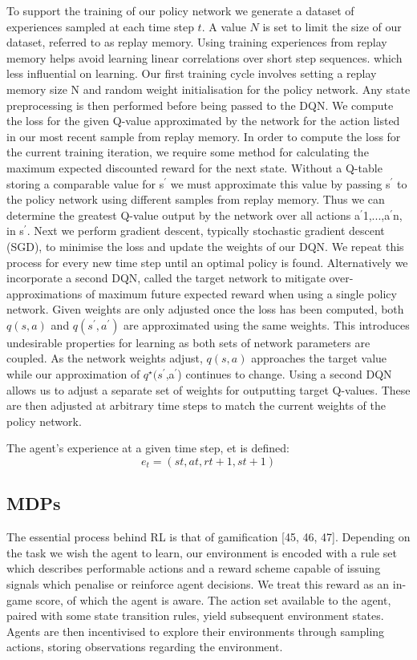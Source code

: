 \documentclass[runningheads]{llncs}
\begin{document}
To support the training of our policy network we generate a dataset of experiences
sampled at each time step $t$. A value $N$ is set to limit the size of our dataset, referred
to as replay memory. Using training experiences from replay memory helps avoid learning linear correlations over short step sequences. which less influential on learning. Our first training cycle involves setting a replay memory size N and random weight initialisation for the policy network. Any state preprocessing is then performed before being passed to the DQN. We compute the loss for the given Q-value approximated by the network for the action listed in our most recent sample from replay memory.
In order to compute the loss for the current training iteration, we require some method for
calculating the maximum expected discounted reward for the next state. Without a Q-table
storing a comparable value for s$^{\prime}$ we must approximate this value by passing s$^{\prime}$ to the policy network using different samples from replay memory. Thus we can determine the
greatest Q-value output by the network over all actions a$^{\prime}$1,...,a$^{\prime}$n, in s$^{\prime}$. Next we perform gradient descent, typically stochastic gradient descent (SGD), to minimise the loss and
update the weights of our DQN. We repeat this process for every new time step until an
optimal policy is found. Alternatively we incorporate a second DQN, called the target network to mitigate over-approximations of maximum future expected reward when using a single policy
network. Given weights are only adjusted once the loss has been computed, both $q(s,a)$
and $q(s^{\prime},a^{\prime})$ are approximated using the same weights. This introduces undesirable properties for learning as both sets of network parameters are coupled. As the network weights adjust, $q(s,a)$ approaches the target value while our approximation of $q^\star(s^{\prime}$,a$^{\prime}$) continues to change. Using a second DQN allows us to adjust a separate set of weights for outputting target Q-values. These are then
adjusted at arbitrary time steps to match the current weights of the policy network.

\begin{theorem}
	The agent’s experience at a given time step, et is
	defined:
	\begin{equation}
	e_{t} = (st,at,rt+1,st+1)
	\end{equation}
\end{theorem}

\subsection{MDPs}
The essential process behind RL is that of gamification [45, 46, 47]. Depending on the task we wish the agent to learn, our environment is encoded with a rule set which describes performable actions and a reward scheme capable of issuing signals which penalise or reinforce agent decisions. We treat this reward as an in-game score, of which the agent is aware. The action set available to the agent, paired with some state transition rules, yield subsequent environment states. Agents are then incentivised to explore their environments through sampling actions, storing observations regarding the environment.
\end{document}
